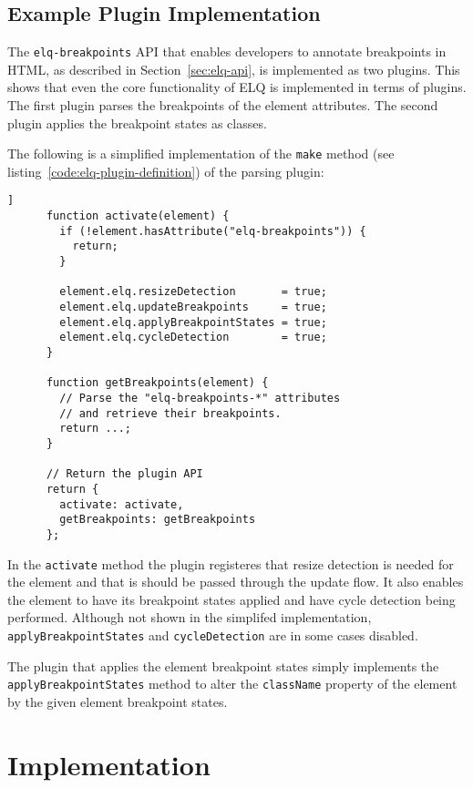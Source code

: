 \documentclass{acm_proc_article-sp}
\newcommand{\code}[1]{\texttt{#1}}
\newcommand{\elq}{ELQ}
\begin{document}
  \subsection{Example Plugin Implementation}
    The \code{elq-breakpoints} API that enables developers to annotate breakpoints in HTML, as described in Section~\ref{sec:elq-api}, is implemented as two plugins.
    This shows that even the core functionality of \elq{} is implemented in terms of plugins.
    The first plugin parses the breakpoints of the element attributes.
    The second plugin applies the breakpoint states as classes.

    The following is a simplified implementation of the \code{make} method (see listing~\ref{code:elq-plugin-definition}) of the parsing plugin:

    \begin{lstlisting}[gobble=6,caption={},captionpos=b,label={}]]
      function activate(element) {
        if (!element.hasAttribute("elq-breakpoints")) {
          return;
        }

        element.elq.resizeDetection       = true;
        element.elq.updateBreakpoints     = true;
        element.elq.applyBreakpointStates = true;
        element.elq.cycleDetection        = true;
      }

      function getBreakpoints(element) {
        // Parse the "elq-breakpoints-*" attributes
        // and retrieve their breakpoints.
        return ...;
      }

      // Return the plugin API
      return {
        activate: activate,
        getBreakpoints: getBreakpoints
      };
    \end{lstlisting}

    In the \code{activate} method the plugin registeres that resize detection is needed for the element and that is should be passed through the update flow.
    It also enables the element to have its breakpoint states applied and have cycle detection being performed.
    Although not shown in the simplifed implementation, \code{applyBreakpointStates} and \code{cycleDetection} are in some cases disabled.

    The plugin that applies the element breakpoint states simply implements the \code{applyBreakpointStates} method to alter the \code{className} property of the element by the given element breakpoint states.

\section{Implementation}
\end{document}
